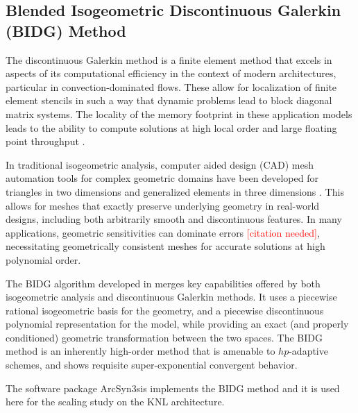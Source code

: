 \subsection{Blended Isogeometric Discontinuous Galerkin (BIDG) Method}
\label{sec:isogeometric}

The discontinuous Galerkin method is a finite element method that excels in
aspects of its computational efficiency in the context of modern architectures,
particular in convection-dominated flows.  These allow for localization of
finite element stencils in such a way that dynamic problems lead to block
diagonal matrix systems.  The locality of the memory footprint in these
application models leads to the ability to compute solutions at high local
order and large floating point throughput \cite{Klockner20097863}.

In traditional isogeometric analysis, computer aided design (CAD) mesh
automation tools for complex geometric domains have been developed for
triangles in two dimensions \cite{Engvall2016378} and generalized elements in
three dimensions \cite{EngvallPress}.  This allows for meshes that exactly
preserve underlying geometry in real-world designs, including both arbitrarily
smooth and discontinuous features.  In many applications, geometric
sensitivities can dominate errors \textcolor{red}{[citation needed]},
necessitating geometrically consistent meshes for accurate solutions at high
polynomial order.

The BIDG algorithm developed in \cite{Michoski2016658} merges key capabilities
offered by both isogeometric analysis and discontinuous Galerkin methods.  It
uses a piecewise rational isogeometric basis for the geometry, and a piecewise
discontinuous polynomial representation for the model, while providing an exact
(and properly conditioned) geometric transformation between the two spaces. The
BIDG method is an inherently high-order method that is amenable to
$hp$-adaptive schemes, and shows requisite super-exponential convergent
behavior.

The software package ArcSyn3sis implements the BIDG method and it is used here
for the scaling study on the KNL architecture.

